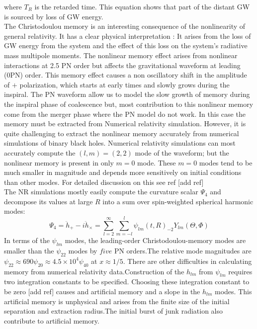 \documentclass[prd,preprintnumbers,twocolumn,eqsecnum,floatfix,letter]{revtex4}
\begin{document}
where $T_{R}$ is the retarded time. This equation shows that part of the distant GW is sourced by loss of GW energy.\\
The Christodoulou memory is an interesting consequence of the nonlinearity of general relativity. It has a clear physical interpretation : It arises from the loss of GW energy from the system and the effect of this loss on the system's radiative mass multipole moments. The nonlinear memory effect arises from nonlinear interactions at 2.5 PN order but affects the gravitational waveform at leading (0PN) order. This memory effect causes a non oscillatory shift in the amplitude of $+$ polarization, which starts at early times and slowly grows during the inspiral. The PN waveform allow us to model the slow growth of memory during the inspiral phase of coalescence but, most contribution to this nonlinear memory come from the merger phase where the PN model do not work. In this case the memory must be extracted from Numerical relativity simulation. However, it is quite challenging to extract the nonlinear memory accurately from numerical simulations of binary black holes.  Numerical relativity simulations can most accurately compute the $(l, m) = (2, 2)$ mode of the waveform; but the nonlinear memory is present in only $m=0$ mode. These $m=0$ modes tend to be much smaller in magnitude and depends more sensitively on	initial conditions than other modes. For detailed discussion on this see ref [add ref] \\
The NR simulations mostly easily compute  the curvature scalar $\Psi_4$ and decompose its values at large $R$ into a sum over spin-weighted spherical harmonic modes:
\begin{equation}
	\Psi_4 = \ddot{h}_+ - \mathit{i}\ddot{h}_\times = \sum_{l=2}^{\infty}\sum_{m=-l}^{l}\psi_{lm}(t, R) _{-2}Y_{lm}(\Theta, \Phi)
\end{equation} 
In terms of the $\psi_{lm}$ modes, the leading-order Christodoulou-memory modes are smaller than the $\psi_{22}$ modes by $five$ PN orders.The relative mode magnitudes are $\psi_{22} \approx 690 \psi_{20}\approx 4.5 \times 10^4 \psi_{40}$ at $x\approx1/5$. There are other difficulties in calculating memory from numerical relativity data.Construction of the $h_{lm}$ from $\psi_{lm}$ requires two integration constants to be specified. Choosing these integration constant to be zero [add ref] causes and artificial memory and a slope in the $h_{lm}$ modes. This artificial memory is unphysical and arises from the finite size of the initial separation and extraction radius.The initial burst of junk radiation also contribute to artificial memory.\\
\end{document}
